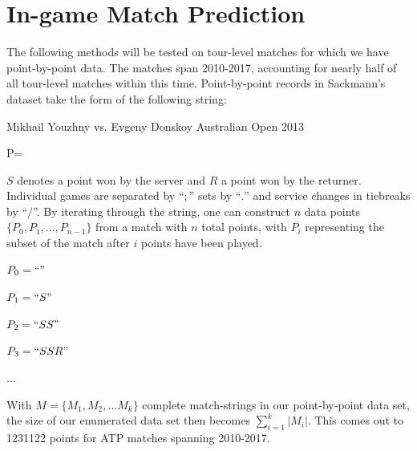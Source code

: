 \documentclass[chapterprefix=false]{report}
\begin{document}





\chapter{In-game Match Prediction}


The following methods will be tested on tour-level matches for which we have point-by-point data. The matches span 2010-2017, accounting for nearly half of all tour-level matches within this time. Point-by-point records in Sackmann's dataset take the form of the following string:

Mikhail Youzhny vs. Evgeny Donskoy Australian Open 2013

P=

$S$ denotes a point won by the server and $R$ a point won by the returner. Individual games are separated by ``$;$'' sets by ``$.$'' and service changes in tiebreaks by ``$/$''. By iterating through the string, one can construct $n$ data points $\{P_0,P_1,...,P_{n-1}\}$ from a match with $n$ total points, with $P_i$ representing the subset of the match after $i$ points have been played.

$P_0 = ``"$

$P_1 = ``S"$

$P_2 = ``SS"$

$P_3 = ``SSR"$

...

With $M = \{M_1,M_2,...M_k\}$ complete match-strings in our point-by-point data set, the size of our enumerated data set then becomes $\sum_{i=1}^k |M_i|$. This comes out to 1231122 points for ATP matches spanning 2010-2017.
\end{document}
